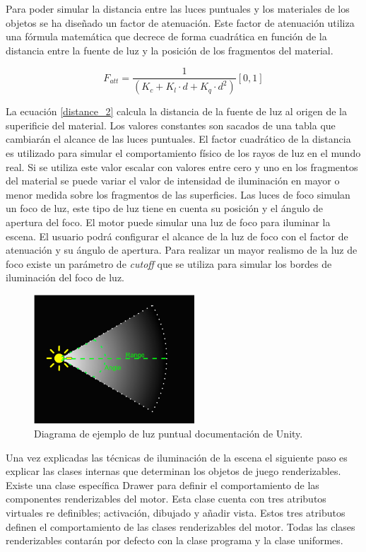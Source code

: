 \documentclass[a4paper]{book}
\begin{document}
Para poder simular la distancia entre las luces puntuales y los materiales de los objetos se ha diseñado un factor de atenuación. Este factor
de atenuación utiliza una fórmula matemática que decrece de forma cuadrática en función de la distancia entre la fuente de luz y la posición
de los fragmentos del material.

\begin{equation} \label{distance_2}
F_{att} = \frac{1} {(K_{c} + K_{l} \cdot d + K_{q} \cdot d^2)} [0 , 1]
\end{equation}

La ecuación \ref{distance_2} calcula la distancia de la fuente de luz al origen de la superificie del material. Los valores constantes son
sacados de una tabla que cambiarán el alcance de las luces puntuales.  El factor cuadrático de la distancia es
utilizado para simular el comportamiento físico de los rayos de luz en el mundo real. Si se utiliza este valor escalar con valores entre
cero y uno en los fragmentos del material se puede variar el valor de intensidad de iluminación en mayor o menor medida sobre los fragmentos
de las superficies. Las luces de foco simulan un foco de luz, este tipo de luz tiene en cuenta su posición y el ángulo de apertura
del foco. El motor puede simular una luz de foco para iluminar la escena. El usuario podrá configurar el alcance
de la luz de foco con el factor de atenuación y su ángulo de apertura. Para realizar un mayor realismo de la
luz de foco existe un parámetro de \textit{cutoff} que se utiliza para simular los bordes de iluminación del foco de luz. \cite{unity:_unity_book} \cite{opengl:_learn_opengl}
\begin{figure}[H]
    \centering
    \includegraphics[width=6cm, keepaspectratio]{img/SpotLightDiagram.png}
    \caption{Diagrama de ejemplo de luz puntual documentación de Unity.}
    \label{SpotLightDiagram}
\end{figure}

Una vez explicadas las técnicas de iluminación de la escena el siguiente paso es explicar las clases internas
que determinan los objetos de juego renderizables. Existe una clase específica Drawer para definir el comportamiento
de las componentes renderizables del motor. Esta clase cuenta con tres atributos virtuales re definibles; activación,
dibujado y añadir vista. Estos tres atributos definen el comportamiento de las clases renderizables del motor. Todas
las clases renderizables contarán por defecto con la clase programa y la clase uniformes.
\end{document}
